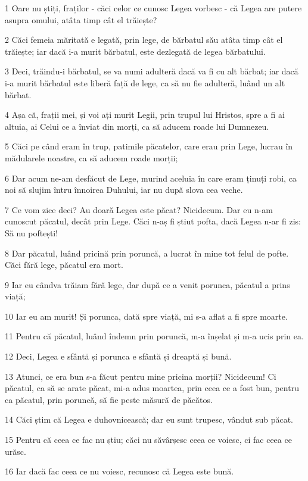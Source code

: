 \par 1 Oare nu știți, fraților - căci celor ce cunosc Legea vorbesc - că Legea are putere asupra omului, atâta timp cât el trăiește?
\par 2 Căci femeia măritată e legată, prin lege, de bărbatul său atâta timp cât el trăiește; iar dacă i-a murit bărbatul, este dezlegată de legea bărbatului.
\par 3 Deci, trăindu-i bărbatul, se va numi adulteră dacă va fi cu alt bărbat; iar dacă i-a murit bărbatul este liberă față de lege, ca să nu fie adulteră, luând un alt bărbat.
\par 4 Așa că, frații mei, și voi ați murit Legii, prin trupul lui Hristos, spre a fi ai altuia, ai Celui ce a înviat din morți, ca să aducem roade lui Dumnezeu.
\par 5 Căci pe când eram în trup, patimile păcatelor, care erau prin Lege, lucrau în mădularele noastre, ca să aducem roade morții;
\par 6 Dar acum ne-am desfăcut de Lege, murind aceluia în care eram ținuți robi, ca noi să slujim întru înnoirea Duhului, iar nu după slova cea veche.
\par 7 Ce vom zice deci? Au doară Legea este păcat? Nicidecum. Dar eu n-am cunoscut păcatul, decât prin Lege. Căci n-aș fi știut pofta, dacă Legea n-ar fi zis: Să nu poftești!
\par 8 Dar păcatul, luând pricină prin poruncă, a lucrat în mine tot felul de pofte. Căci fără lege, păcatul era mort.
\par 9 Iar eu cândva trăiam fără lege, dar după ce a venit porunca, păcatul a prins viață;
\par 10 Iar eu am murit! Și porunca, dată spre viață, mi s-a aflat a fi spre moarte.
\par 11 Pentru că păcatul, luând îndemn prin poruncă, m-a înșelat și m-a ucis prin ea.
\par 12 Deci, Legea e sfântă și porunca e sfântă și dreaptă și bună.
\par 13 Atunci, ce era bun s-a făcut pentru mine pricina morții? Nicidecum! Ci păcatul, ca să se arate păcat, mi-a adus moartea, prin ceea ce a fost bun, pentru ca păcatul, prin poruncă, să fie peste măsură de păcătos.
\par 14 Căci știm că Legea e duhovnicească; dar eu sunt trupesc, vândut sub păcat.
\par 15 Pentru că ceea ce fac nu știu; căci nu săvârșesc ceea ce voiesc, ci fac ceea ce urăsc.
\par 16 Iar dacă fac ceea ce nu voiesc, recunosc că Legea este bună.
